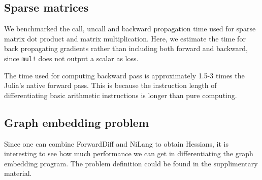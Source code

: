 \documentclass{article}
\newcommand{\<}{\langle}
\renewcommand{\>}{\rangle}
\newcommand{\ra}[1]{\renewcommand{\arraystretch}{#1}}
\theoremstyle{definition}\newtheorem{definition}{\textit{Definition}}
\begin{document}
\subsection{Sparse matrices}\label{sec:benchsparse}
We benchmarked the call, uncall and backward propagation time used for sparse matrix dot product and matrix multiplication.
Here, we estimate the time for back propagating gradients rather than including both forward and backward, since \texttt{mul!} does not output a scalar as loss.

\begin{table}[h!]\centering
\begin{minipage}{0.8\columnwidth}
\ra{1.3}
    \caption{Absolute runtimes in seconds for computing the objectives (O) and the backward pass (B) of sparse matrix operations. The matrix size is $1000 \times 1000$, and the element density is $0.05$. The total time used in computing gradient can be estimated by summing ``O'' and ``B''.
    }\label{tbl:sparse}
\end{minipage}
\end{table}

The time used for computing backward pass is approximately 1.5-3 times the Julia's native forward pass.
This is because the instruction length of differentiating basic arithmetic instructions is longer than pure computing.


\subsection{Graph embedding problem}\label{sec:graphbench}
Since one can combine ForwardDiff and NiLang to obtain Hessians,
it is interesting to see how much performance we can get in differentiating the graph embedding program. The problem definition could be found in the supplimentary material.
\end{document}
